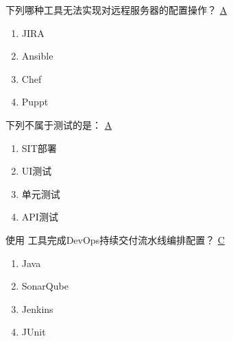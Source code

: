 \begin{problem}
	下列哪种工具无法实现对远程服务器的配置操作？
	\uline{A}    
    \vspace{-0.8em}
    \begin{multicols}{4}
        \begin{enumerate}[label=\Alph*.]
            \item JIRA
            \item Ansible
            \item Chef
            \item Puppt
        \end{enumerate}
    \end{multicols}
    \vspace{-1em}
\end{problem}


\begin{problem}
	​下列不属于测试的是：
	\uline{A}    
    \vspace{-0.8em}
    \begin{multicols}{4}
        \begin{enumerate}[label=\Alph*.]
            \item SIT部署
            \item UI测试
            \item 单元测试
            \item API测试
        \end{enumerate}
    \end{multicols}
    \vspace{-1em}
\end{problem}


\begin{problem}
	使用 \underline{\qquad \qquad} 工具完成DevOps持续交付流水线编排配置？
	\uline{C}    
    \vspace{-0.8em}
    \begin{multicols}{4}
        \begin{enumerate}[label=\Alph*.]
            \item Java
            \item SonarQube
            \item Jenkins
            \item JUnit
        \end{enumerate}
    \end{multicols}
    \vspace{-1em}
\end{problem}


